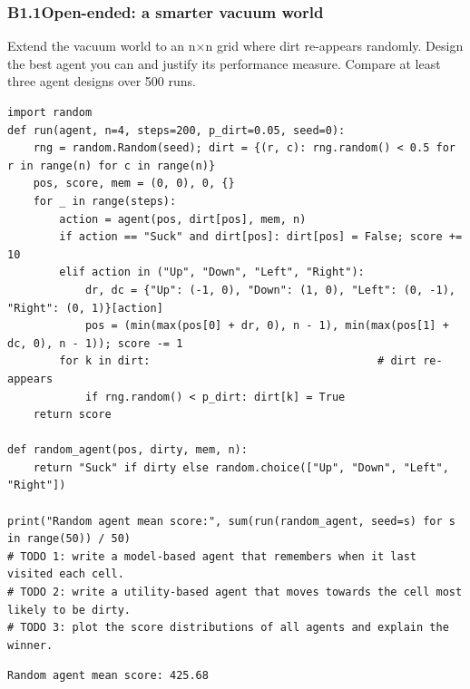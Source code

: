 \documentclass[11pt]{article}
\begin{document}
\subsubsection*{B1.1\quad Open-ended: a smarter vacuum world}
Extend the vacuum world to an n$\times$n grid where dirt re-appears randomly. Design the best agent you can and justify its performance measure. Compare at least three agent designs over 500 runs.
\begin{lstlisting}[style=py]
import random
def run(agent, n=4, steps=200, p_dirt=0.05, seed=0):
    rng = random.Random(seed); dirt = {(r, c): rng.random() < 0.5 for r in range(n) for c in range(n)}
    pos, score, mem = (0, 0), 0, {}
    for _ in range(steps):
        action = agent(pos, dirt[pos], mem, n)
        if action == "Suck" and dirt[pos]: dirt[pos] = False; score += 10
        elif action in ("Up", "Down", "Left", "Right"):
            dr, dc = {"Up": (-1, 0), "Down": (1, 0), "Left": (0, -1), "Right": (0, 1)}[action]
            pos = (min(max(pos[0] + dr, 0), n - 1), min(max(pos[1] + dc, 0), n - 1)); score -= 1
        for k in dirt:                                   # dirt re-appears
            if rng.random() < p_dirt: dirt[k] = True
    return score

def random_agent(pos, dirty, mem, n):
    return "Suck" if dirty else random.choice(["Up", "Down", "Left", "Right"])

print("Random agent mean score:", sum(run(random_agent, seed=s) for s in range(50)) / 50)
# TODO 1: write a model-based agent that remembers when it last visited each cell.
# TODO 2: write a utility-based agent that moves towards the cell most likely to be dirty.
# TODO 3: plot the score distributions of all agents and explain the winner.
\end{lstlisting}
\begin{lstlisting}[style=out]
Random agent mean score: 425.68
\end{lstlisting}
\end{document}
